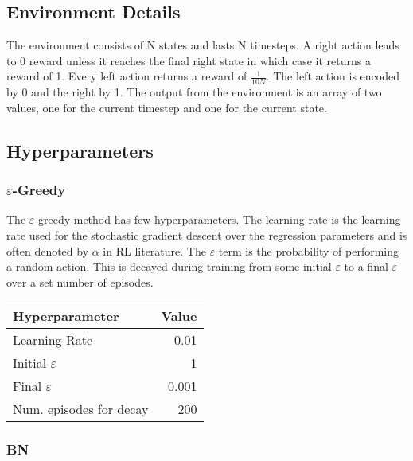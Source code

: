 {{\subsection{Environment Details}

The environment consists of N states and lasts N timesteps. A right action leads to 0 reward unless it reaches the final right state in which case it returns a reward of 1. Every left action returns a reward of $\frac{1}{10N}$. The left action is encoded by 0 and the right by 1. The output from the environment is an array of two values, one for the current timestep and one for the current state.

\subsection{Hyperparameters}

\subsubsection{$\varepsilon$-Greedy}

The $\varepsilon$-greedy method has few hyperparameters. The learning rate is the learning rate used for the stochastic gradient descent over the regression parameters and is often denoted by $\alpha$ in RL literature. The $\varepsilon$ term is the probability of performing a random action. This is decayed during training from some initial $\varepsilon$ to a final $\varepsilon$ over a set number of episodes.

\begin{table}[H]
    \centering
    \begin{tabular}{@{}lr@{}}
        \toprule
        Hyperparameter                     & Value \\ \midrule
        Learning Rate                      & 0.01  \\
        Initial $\varepsilon$              & 1     \\
        Final $\varepsilon$                & 0.001 \\
        Num. episodes for decay            & 200   \\ \bottomrule
    \end{tabular}
\end{table}

\subsubsection{BN}

}}
